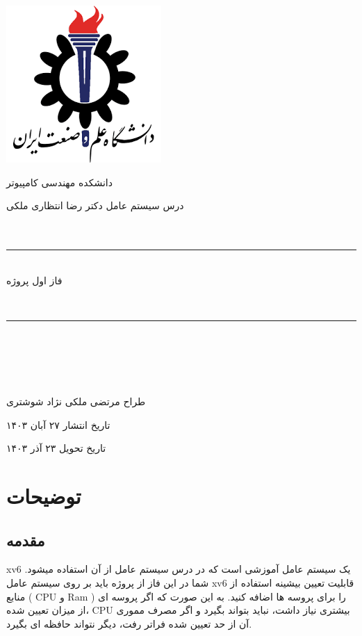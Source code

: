 \documentclass{article}
\begin{document}
		\linespread{3}
		
		\begin{center}
			\includegraphics{logo.png}  
			
			\Large{دانشکده مهندسی کامپیوتر}
			
			\Large{درس سیستم عامل}
			\Large{
			دکتر رضا انتظاری ملکی
			}
			\\
			~\\
			~\\
			\hrule 
			~\\
                                 فاز اول پروژه
                                 		\end{center}
			~\\
			
			\hrule 
			~\\
			~\\
			~\\
			~\\	


			\begin{center}



			
			طراح
			\dotfill 
			مرتضی ملکی نژاد شوشتری


			
			تاریخ انتشار 
			\dotfill 
			۲۷ آبان ۱۴۰۳

			
			تاریخ تحویل
			\dotfill
			۲۳ آذر ۱۴۰۳
						\end{center}
			
			\newpage

		\section{توضیحات}
		\subsection{مقدمه}
		xv6
		یک سیستم عامل آموزشی است  که در درس سیستم عامل از آن استفاده میشود.
		شما در این فاز از پروژه باید بر روی سیستم عامل xv6 قابلیت تعیین بیشینه استفاده از منابع  ( CPU و Ram ) را برای پروسه ها اضافه کنید. به این صورت که اگر پروسه ای از میزان تعیین شده، CPU بیشتری نیاز داشت، نباید بتواند بگیرد و اگر مصرف مموری آن از حد تعیین شده فراتر رفت، دیگر نتواند حافظه ای بگیرد.
		
\end{document}
